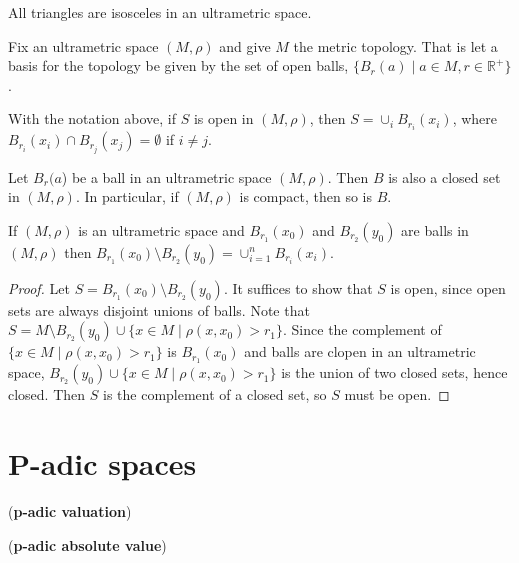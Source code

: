 \begin{proposition}
	All triangles are isosceles in an ultrametric space.
\end{proposition}

\noindent Fix an ultrametric space $(M, \rho)$ and give $M$ the metric topology. That is let a basis for the topology be given by the set of open balls, $ \{B_r(a) \mid a \in M, r \in  \mathbb{R}^+\} $. 

\begin{proposition}
	With the notation above, if $S$ is open in $(M, \rho)$, then $S=\cup_i B_{r_i}(x_i)$, where $B_{r_i}(x_i) \cap B_{r_j}(x_j) = \emptyset$ if $i \neq j$.
\end{proposition}

\begin{proposition}
	Let $B_r(a$) be a ball in an ultrametric space $(M,\rho)$. Then $B$ is also a closed set in $(M,\rho)$. In particular, if $(M,\rho)$ is compact, then so is $B$.    
\end{proposition}

\begin{proposition}
	If $(M, \rho)$ is an ultrametric space and $B_{r_1}(x_0)$ and $B_{r_2}(y_0)$ are balls in $(M, \rho)$ then $B_{r_1}(x_0) \setminus B_{r_2}(y_0) = \cup_{i=1}^n B_{r_i}(x_i)$.
\end{proposition}

\begin{proof}
	Let $S = B_{r_1}(x_0) \setminus B_{r_2}(y_0)$. It suffices to show that $S$ is open, since open sets are always disjoint unions of balls. Note that $S = M  \setminus B_{r_2}(y_0) \cup \{x \in M \mid \rho(x, x_0) > r_1\}$. Since the complement of $\{x \in M \mid \rho(x, x_0) > r_1\}$ is  $B_{r_1}(x_0)$ and balls are clopen in an ultrametric space, $B_{r_2}(y_0) \cup \{x \in M \mid \rho(x, x_0) > r_1\}$ is the union of two closed sets, hence closed. Then $S$ is the complement of a closed set, so $S$ must be open. 
\end{proof}



\section{P-adic spaces}
\begin{definition}
	(\textbf{p-adic valuation})
\end{definition}

\begin{definition}
	(\textbf{p-adic absolute value})
\end{definition}

